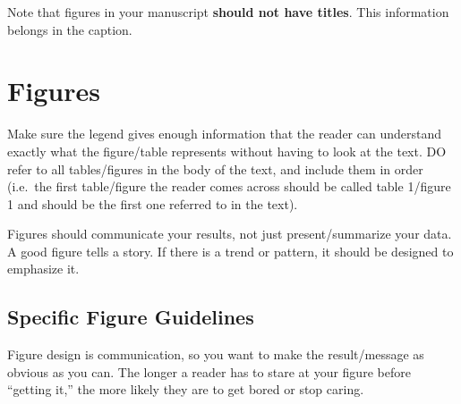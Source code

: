 \documentclass[]{book}
\begin{document}
Note that figures in your manuscript \textbf{should not have titles}.
This information belongs in the caption.

\section{Figures}\label{figures}

Make sure the legend gives enough information that the reader can
understand exactly what the figure/table represents without having to
look at the text. DO refer to all tables/figures in the body of the
text, and include them in order (i.e.~the first table/figure the reader
comes across should be called table 1/figure 1 and should be the first
one referred to in the text).

Figures should communicate your results, not just present/summarize your
data. A good figure tells a story. If there is a trend or pattern, it
should be designed to emphasize it.

\subsection{Specific Figure
Guidelines}\label{specific-figure-guidelines}

Figure design is communication, so you want to make the result/message
as obvious as you can. The longer a reader has to stare at your figure
before ``getting it,'' the more likely they are to get bored or stop
caring.
\end{document}
